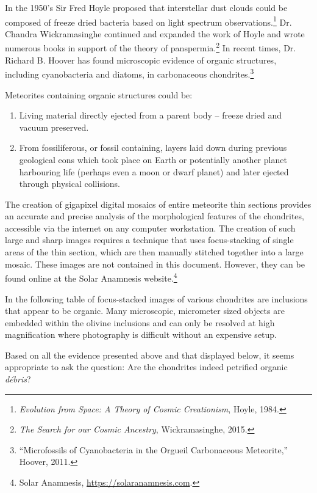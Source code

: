 \documentclass[a4paper, 12pt, oneside]{article}
\begin{document}
In the 1950's Sir Fred Hoyle proposed that interstellar dust clouds could be composed of freeze dried bacteria based on light spectrum observations.\footnote{\emph{Evolution from Space: A Theory of Cosmic Creationism}, Hoyle, 1984.} Dr. Chandra Wickramasinghe continued and expanded the work of Hoyle and wrote numerous books in support of the theory of panspermia.\footnote{\emph{The Search for our Cosmic Ancestry}, Wickramasinghe, 2015.} In recent times, Dr. Richard B. Hoover has found microscopic evidence of organic structures, including cyanobacteria and diatoms, in carbonaceous chondrites.\footnote{``Microfossils of Cyanobacteria in the Orgueil Carbonaceous Meteorite,'' Hoover, 2011.}

Meteorites containing organic structures could be:

\begin{enumerate}
   \item Living material directly ejected from a parent body -- freeze dried and vacuum preserved.
   \item From fossiliferous, or fossil containing, layers laid down during previous geological eons which took place on Earth or potentially another planet harbouring life (perhaps even a moon or dwarf planet) and later ejected through physical collisions.
\end{enumerate}

The creation of gigapixel digital mosaics of entire meteorite thin sections provides an accurate and precise analysis of the morphological features of the chondrites, accessible via the internet on any computer workstation. The creation of such large and sharp images requires a technique that uses focus-stacking of single areas of the thin section, which are then manually stitched together into a large mosaic. These images are not contained in this document. However, they can be found online at the Solar Anamnesis website.\footnote{Solar Anamnesis, \url{https://solaranamnesis.com}.}

In the following table of focus-stacked images of various chondrites are inclusions that appear to be organic. Many microscopic, micrometer sized objects are embedded within the olivine inclusions and can only be resolved at high magnification where photography is difficult without an expensive setup.

Based on all the evidence presented above and that displayed below, it seems appropriate to ask the question: Are the chondrites indeed petrified organic \emph{débris}?
\clearpage
\end{document}
